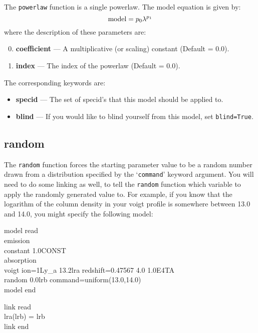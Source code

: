 The \texttt{powerlaw} function is a single powerlaw. The model equation is given by:
\begin{equation}
{\rm model}=p_0\lambda^{p_1}
\end{equation}
where the description of these parameters are:
\begin{enumerate}
\setcounter{enumi}{-1}
\item \textbf{coefficient} --- A multiplicative (or scaling) constant (Default = 0.0).
\item \textbf{index} --- The index of the powerlaw (Default = 0.0).
\end{enumerate}
The corresponding keywords are:
\begin{itemize}
\item \textbf{specid} --- The set of specid's that this model should be applied to.
\item \textbf{blind} --- If you would like to blind yourself from this model, set \texttt{blind=True}.
\end{itemize}


\subsection{random}

The \texttt{random} function forces the starting parameter value to be a random number drawn from a distribution specified by the `\texttt{command}' keyword argument. You will need to do some linking as
well, to tell the \texttt{random} function which variable to apply the randomly generated value to. For
example, if you know that the logarithm of the column density in your voigt profile is somewhere
between 13.0 and 14.0, you might specify the following model:

\vspace{0.3cm}
\begin{mdframed}[style=MyFrame]
model read\\
emission\\
constant 1.0CONST\\
absorption\\
voigt ion=1Ly\_a    13.2lra   redshift=0.47567    4.0   1.0E4TA\\
random 0.0lrb  command=uniform(13.0,14.0)\\
model end\\

\vspace{0.1cm}

\noindent
link read\\
lra(lrb) = lrb\\
link end\\
\end{mdframed}
\vspace{0.2cm}

